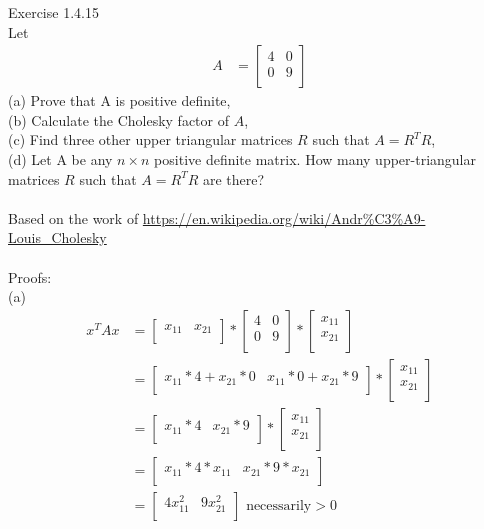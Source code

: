 \documentclass{article}
\begin{document}
	Exercise 1.4.15\\
	Let\\
	\begin{align*}
	A &= \begin{bmatrix}
		4 & 0\\
		0 & 9\\
		\end{bmatrix}
	\end{align*}
	(a) Prove that A is positive definite,\\
	(b) Calculate the Cholesky factor of $A$,\\
	(c) Find three other upper triangular matrices $R$ such that $A = R^TR$,\\
	(d) Let A be any $n \times n$ positive definite matrix. How many upper-triangular matrices $R$ such that $A = R^TR$ are there?\\
	\\
	Based on the work of \url{https://en.wikipedia.org/wiki/Andr\%C3\%A9-Louis_Cholesky}\\
	\\
	Proofs:\\
	(a)\\
	\begin{align*}
	x^TAx &= \begin{bmatrix}
	x_{11} & x_{21}\\
	\end{bmatrix} * \begin{bmatrix}
	4 & 0\\
	0 & 9\\
	\end{bmatrix} * \begin{bmatrix}
	x_{11}\\
	x_{21}\\
	\end{bmatrix}\\
	&= \begin{bmatrix}
	x_{11}*4 + x_{21}*0 & x_{11}*0 + x_{21}*9\\
	\end{bmatrix} * \begin{bmatrix}
	x_{11}\\
	x_{21}\\
	\end{bmatrix}\\
	&= \begin{bmatrix}
	x_{11}*4 & x_{21}*9\\
	\end{bmatrix} * \begin{bmatrix}
	x_{11}\\
	x_{21}\\
	\end{bmatrix}\\
	&= \begin{bmatrix}
	x_{11}*4*x_{11} & x_{21}*9*x_{21}\\
	\end{bmatrix}\\	
	&= \begin{bmatrix}
	4x_{11}^2 & 9x_{21}^2\\
	\end{bmatrix} \text{ necessarily} > 0\\	
	\end{align*}
\end{document}
